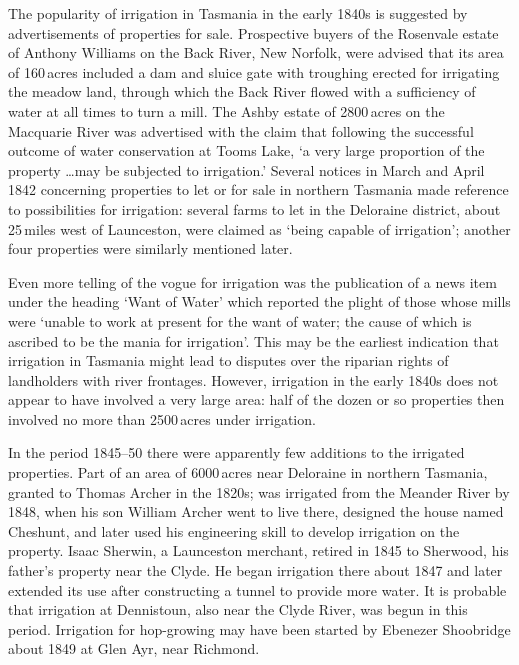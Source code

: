 The popularity of irrigation in Tasmania in the early 1840s is
suggested by advertisements of properties for sale.  Prospective
buyers of the Rosenvale estate of Anthony Williams
on the Back River, New Norfolk, were advised that
its area of 160\,acres included a dam and sluice gate with troughing
erected for irrigating the meadow land, through which the Back River
flowed with a sufficiency of water at all times to turn a mill.  The
Ashby estate of 2800\,acres on the Macquarie
River was advertised with the claim that
following the successful outcome of water conservation at Tooms
Lake, `a very large proportion of the property
\ldots may be subjected to irrigation.'  Several notices in March and
April 1842 concerning properties to let or for sale in northern
Tasmania made reference to possibilities for irrigation: several farms
to let in the Deloraine district,
about 25\,miles west of Launceston, were claimed as `being capable of
irrigation'; another four properties were similarly mentioned
later.

Even more telling of the vogue for irrigation was the publication of a
news item under the heading `Want of Water' which reported the plight
of those whose mills were `unable to work at present for the want of
water; the cause of which is ascribed to be the mania for
irrigation'.  This may
be the earliest indication that irrigation in Tasmania might lead to
disputes over the riparian rights of landholders with river frontages.
However, irrigation in the early 1840s does not appear to have
involved a very large area: half of the dozen or so properties then
involved no more than 2500\,acres under irrigation.

In the period 1845--50 there were apparently few additions to the
irrigated properties.  Part of an area of 6000\,acres near Deloraine
in northern Tasmania, granted to Thomas Archer in
the 1820s; was irrigated from the Meander River
by 1848, when his son William Archer went to live
there, designed the house named Ches\-hunt, and later used his
engineering skill to develop irrigation on the property.  Isaac
Sherwin, a Launceston merchant, retired in 1845 to
Sherwood, his father's property near the Clyde.  He began irrigation
there about 1847 and later extended its use after constructing a
tunnel to provide more water.  It is probable that irrigation at
Dennistoun, also near the Clyde River,
 was begun in
this period.  Irrigation for hop-growing may have been
started by Ebenezer Shoobridge about 1849 at
Glen Ayr, near Richmond.

